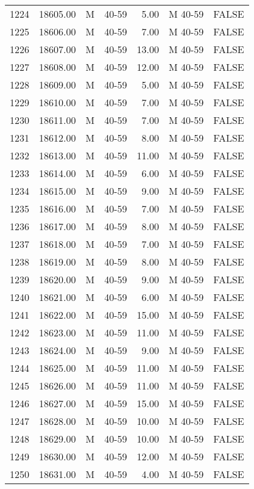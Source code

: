 \begin{table}[ht]
\begin{tabular}{rrllrll}
  1224 & 18605.00 & M & 40-59 & 5.00 & M 40-59 & FALSE \\ 
  1225 & 18606.00 & M & 40-59 & 7.00 & M 40-59 & FALSE \\ 
  1226 & 18607.00 & M & 40-59 & 13.00 & M 40-59 & FALSE \\ 
  1227 & 18608.00 & M & 40-59 & 12.00 & M 40-59 & FALSE \\ 
  1228 & 18609.00 & M & 40-59 & 5.00 & M 40-59 & FALSE \\ 
  1229 & 18610.00 & M & 40-59 & 7.00 & M 40-59 & FALSE \\ 
  1230 & 18611.00 & M & 40-59 & 7.00 & M 40-59 & FALSE \\ 
  1231 & 18612.00 & M & 40-59 & 8.00 & M 40-59 & FALSE \\ 
  1232 & 18613.00 & M & 40-59 & 11.00 & M 40-59 & FALSE \\ 
  1233 & 18614.00 & M & 40-59 & 6.00 & M 40-59 & FALSE \\ 
  1234 & 18615.00 & M & 40-59 & 9.00 & M 40-59 & FALSE \\ 
  1235 & 18616.00 & M & 40-59 & 7.00 & M 40-59 & FALSE \\ 
  1236 & 18617.00 & M & 40-59 & 8.00 & M 40-59 & FALSE \\ 
  1237 & 18618.00 & M & 40-59 & 7.00 & M 40-59 & FALSE \\ 
  1238 & 18619.00 & M & 40-59 & 8.00 & M 40-59 & FALSE \\ 
  1239 & 18620.00 & M & 40-59 & 9.00 & M 40-59 & FALSE \\ 
  1240 & 18621.00 & M & 40-59 & 6.00 & M 40-59 & FALSE \\ 
  1241 & 18622.00 & M & 40-59 & 15.00 & M 40-59 & FALSE \\ 
  1242 & 18623.00 & M & 40-59 & 11.00 & M 40-59 & FALSE \\ 
  1243 & 18624.00 & M & 40-59 & 9.00 & M 40-59 & FALSE \\ 
  1244 & 18625.00 & M & 40-59 & 11.00 & M 40-59 & FALSE \\ 
  1245 & 18626.00 & M & 40-59 & 11.00 & M 40-59 & FALSE \\ 
  1246 & 18627.00 & M & 40-59 & 15.00 & M 40-59 & FALSE \\ 
  1247 & 18628.00 & M & 40-59 & 10.00 & M 40-59 & FALSE \\ 
  1248 & 18629.00 & M & 40-59 & 10.00 & M 40-59 & FALSE \\ 
  1249 & 18630.00 & M & 40-59 & 12.00 & M 40-59 & FALSE \\ 
  1250 & 18631.00 & M & 40-59 & 4.00 & M 40-59 & FALSE \\ 

\end{tabular}
\end{table}
